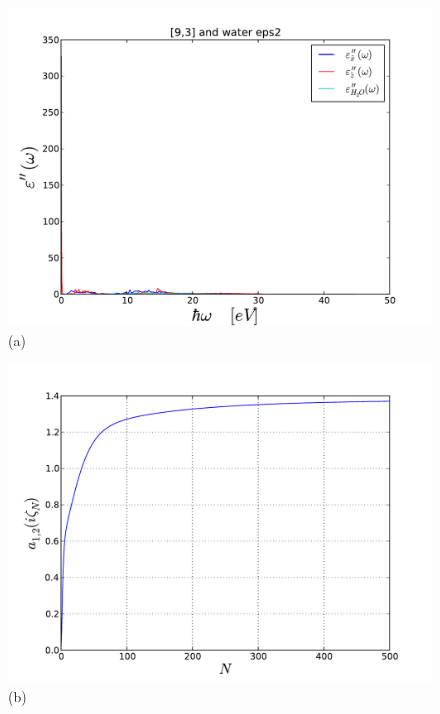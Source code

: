 \documentclass[onecolumn,letterpaper,amsmath,amssymb,floatfix,aps,superscriptaddress]{revtex4}
\begin{document}
\begin{figure}[t!]
\begin{center}
\begin{minipage}[b]{0.40\textwidth}
\begin{center}
\includegraphics[width=1.2\textwidth]{eps_93.pdf} (a)
\end{center}
\end{minipage}
\hskip 43pt
\begin{minipage}[b]{0.40\textwidth}
\begin{center}
\includegraphics[width=1.2\textwidth]{aiz_93.pdf} (b)
\end{center}
\end{minipage}

\end{center}
\end{figure}
\end{document}
